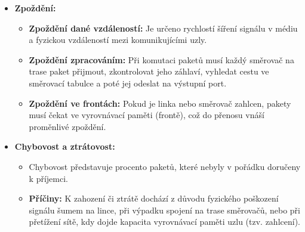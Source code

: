             \begin{itemize}
                \item{\textbf{Zpoždění:}}
                    \begin{itemize}
                        \item \textbf{Zpoždění dané vzdáleností:} Je určeno rychlostí šíření signálu v médiu a fyzickou vzdáleností mezi komunikujícími uzly.
                        \item \textbf{Zpoždění zpracováním:} Při komutaci paketů musí každý směrovač na trase paket přijmout, zkontrolovat jeho záhlaví, vyhledat cestu ve směrovací tabulce a poté jej odeslat na výstupní port.
                        \item \textbf{Zpoždění ve frontách:} Pokud je linka nebo směrovač zahlcen, pakety musí čekat ve vyrovnávací paměti (frontě), což do přenosu vnáší proměnlivé zpoždění.
                    \end{itemize}
                \item{\textbf{Chybovost a ztrátovost:}}
                    \begin{itemize}
                        \item Chybovost představuje procento paketů, které nebyly v pořádku doručeny k příjemci.
                        \item \textbf{Příčiny:} K zahození či ztrátě dochází z důvodu fyzického poškození signálu šumem na lince, při výpadku spojení na trase směrovačů, nebo při přetížení sítě, kdy dojde kapacita vyrovnávací paměti uzlu (tzv. zahlcení).
                    \end{itemize}
            \end{itemize}

